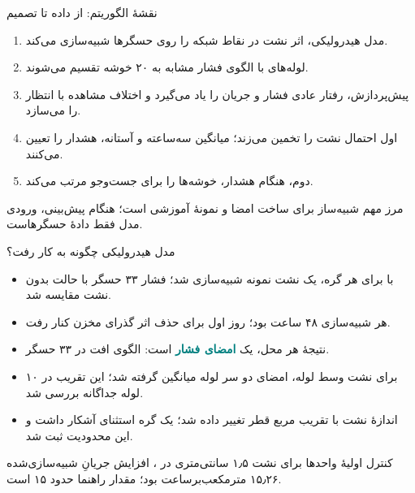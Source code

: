 \documentclass[aspectratio=169,11pt]{beamer}
\newcommand{\key}[1]{\textcolor{teal}{\textbf{#1}}}
\newcommand{\eng}[1]{\lr{#1}}
\begin{document}
\begin{frame}{نقشهٔ الگوریتم: از داده تا تصمیم}
  \begin{enumerate}
  \item مدل هیدرولیکی، اثر نشت در نقاط شبکه را روی حسگرها شبیه‌سازی می‌کند.
  \item لوله‌های با الگوی فشار مشابه به ۲۰ خوشه تقسیم می‌شوند.
  \item پیش‌پردازش، رفتار عادی فشار و جریان را یاد می‌گیرد و اختلاف مشاهده با انتظار را می‌سازد.
  \item \eng{MLP} اول احتمال نشت را تخمین می‌زند؛ میانگین سه‌ساعته و آستانه، هشدار را تعیین می‌کنند.
  \item \eng{MLP} دوم، هنگام هشدار، خوشه‌ها را برای جست‌وجو مرتب می‌کند.
  \end{enumerate}
  \vspace{0.5em}
  \begin{block}{مرز مهم}
  شبیه‌ساز برای ساخت امضا و نمونهٔ آموزشی است؛ هنگام پیش‌بینی، ورودی مدل فقط دادهٔ حسگرهاست.
  \end{block}
\end{frame}

\begin{frame}{مدل هیدرولیکی چگونه به کار رفت؟}
  \begin{itemize}
  \item با \eng{WNTR/EPANET} برای هر گره، یک نشت نمونه شبیه‌سازی شد؛ فشار ۳۳ حسگر با حالت بدون نشت مقایسه شد.
  \item هر شبیه‌سازی ۴۸ ساعت بود؛ روز اول برای حذف اثر گذرای مخزن کنار رفت.
  \item نتیجهٔ هر محل، یک \key{امضای فشار} است: الگوی افت در ۳۳ حسگر.
  \item برای نشت وسط لوله، امضای دو سر لوله میانگین گرفته شد؛ این تقریب در ۱۰ لوله جداگانه بررسی شد.
  \item اندازهٔ نشت با تقریب مربع قطر تغییر داده شد؛ یک گره استثنای آشکار داشت و این محدودیت ثبت شد.
  \end{itemize}
  \begin{block}{کنترل اولیهٔ واحدها}
  برای نشت ۱٫۵ سانتی‌متری در \eng{n500}، افزایش جریانِ شبیه‌سازی‌شده ۱۵٫۲۶ مترمکعب‌برساعت بود؛ مقدار راهنما حدود ۱۵ است.
  \end{block}
\end{frame}
\end{document}
